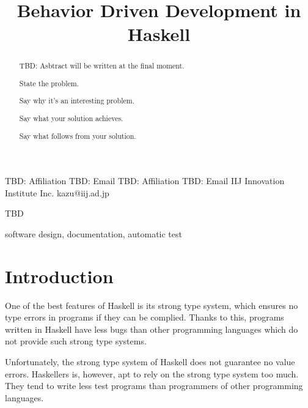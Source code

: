\documentclass[preprint]{sigplanconf}
\begin{document}
\copyrightdata{[to be supplied]}


\title{Behavior Driven Development in Haskell}

           {TBD: Affiliation}
           {TBD: Email}
           {TBD: Affiliation}
           {TBD: Email}
           {IIJ Innovation Institute Inc.}
           {kazu@iij.ad.jp}

\maketitle

\begin{abstract}

TBD: Asbtract will be written at the final moment.

State the problem.

Say why it’s an interesting problem.

Say what your solution achieves.

Say what follows from your solution.

\end{abstract}


\terms
TBD

\keywords
software design, documentation, automatic test

\section{Introduction}


One of the best features of Haskell is its strong type system, 
which ensures no type errors in programs if they can be complied.
Thanks to this, programs written in Haskell have less bugs
than other programming languages which do not provide such strong type systems.

Unfortunately, the strong type system of Haskell does not guarantee
no value errors.
Haskellers is, however, apt to rely on the strong type system too much.
They tend to write less test programs than programmers of other
programming languages.
\end{document}
